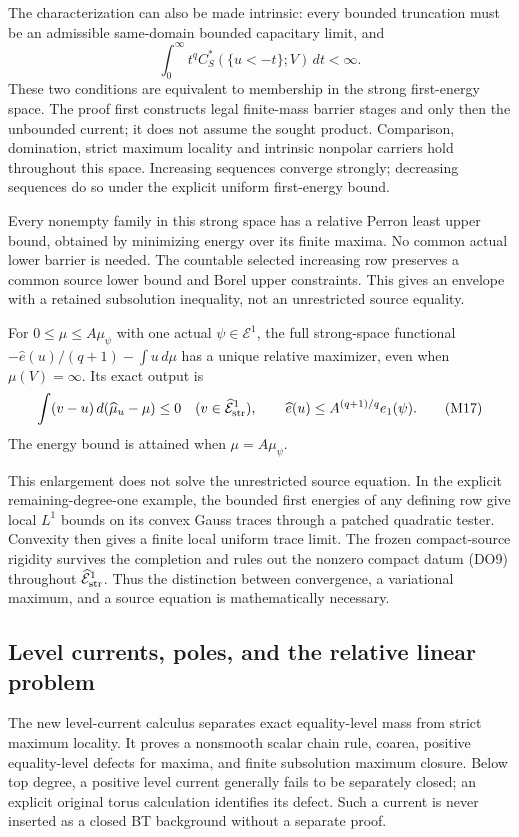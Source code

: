 \documentclass[11pt,a4paper]{article}
\numberwithin{equation}{section}
\theoremstyle{definition}
\theoremstyle{remark}
\begin{document}
The characterization can also be made intrinsic: every bounded
truncation must be an admissible same-domain bounded capacitary
limit, and
\[
                  \int_0^\infty t^q
                        C_S^*(\{u<-t\};V)\,dt<\infty.
 \tag{M16}
\]
These two conditions are equivalent to membership in the
strong first-energy space. The proof first constructs legal
finite-mass barrier stages and only then the unbounded
current; it does not assume the sought product.
Comparison, domination, strict maximum locality and intrinsic
nonpolar carriers hold throughout this space. Increasing
sequences converge strongly; decreasing sequences do so under
the explicit uniform first-energy bound.

Every nonempty family in this strong space has a relative
Perron least upper bound, obtained by minimizing energy over
its finite maxima. No common actual lower barrier is needed.
The countable selected increasing row preserves a common
source lower bound and Borel upper constraints. This gives
an envelope with a retained subsolution inequality, not
an unrestricted source equality.

For $0\leq\mu\leq A\mu_\psi$ with one actual
$\psi\in\mathcal E^1$, the full strong-space functional
$-\widehat e(u)/(q+1)-\int u\,d\mu$ has a unique relative
maximizer, even when $\mu(V)=\infty$. Its exact output is
\[
 \int(v-u)\,d(\widehat\mu_u-\mu)\leq0
                 \quad(v\in\widehat{\mathcal E}^1_{\rm str}),
 \qquad
 \widehat e(u)\leq A^{(q+1)/q}e_1(\psi).
 \tag{M17}
\]
The energy bound is attained when $\mu=A\mu_\psi$.

This enlargement does not solve the unrestricted source
equation. In the explicit remaining-degree-one example,
the bounded first energies of any defining row give local
$L^1$ bounds on its convex Gauss traces through a patched
quadratic tester. Convexity then gives a finite local uniform
trace limit. The frozen compact-source rigidity survives
the completion and rules out the nonzero compact datum
(DO9) throughout $\widehat{\mathcal E}^1_{\rm str}$.
Thus the distinction between convergence, a variational
maximum, and a source equation is mathematically necessary.

\subsection{Level currents, poles, and the relative linear problem}

The new level-current calculus separates exact
equality-level mass from strict maximum locality.
It proves a nonsmooth scalar chain rule, coarea,
positive equality-level defects for maxima, and
finite subsolution maximum closure.
Below top degree, a positive level current generally
fails to be separately closed; an explicit original
torus calculation identifies its defect.
Such a current is never inserted as a closed BT
background without a separate proof.
\end{document}
